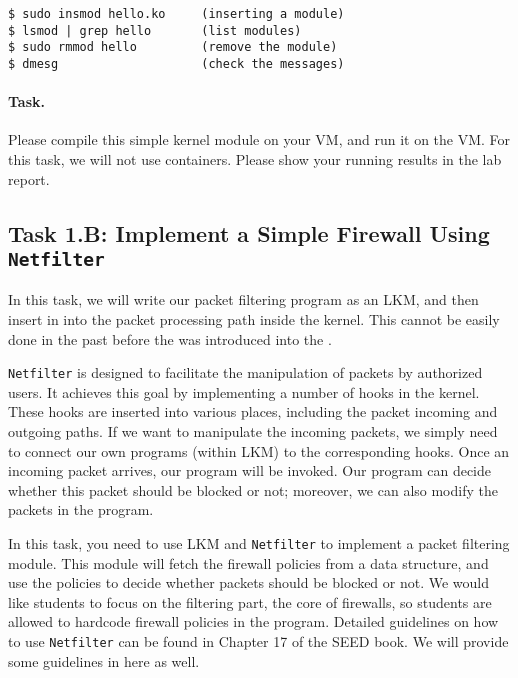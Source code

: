 \begin{lstlisting}
$ sudo insmod hello.ko     (inserting a module)
$ lsmod | grep hello       (list modules)
$ sudo rmmod hello         (remove the module)
$ dmesg                    (check the messages)
\end{lstlisting}


\paragraph{Task.} Please compile this simple kernel module on 
your VM, and run it on the VM. For this task, we will not use 
containers.  Please show your running results in the lab report. 


\subsection{Task 1.B: Implement a Simple Firewall Using \texttt{Netfilter}}  


In this task, we will write our packet filtering program
as an LKM, and then insert in into the packet processing path
inside the kernel. This cannot be easily done in the past before 
the \netfilter was introduced into the \linux.

{\tt Netfilter} is designed to facilitate the manipulation of 
packets by authorized users. It achieves this 
goal by implementing a number of hooks in the 
\linux kernel. These hooks are inserted into various places, 
including the packet incoming and outgoing paths. 
If we want to manipulate the incoming packets, we simply
need to connect our own programs (within LKM) to the 
corresponding hooks. Once an incoming packet arrives, 
our program will be invoked. Our program can decide 
whether this packet should be blocked or not; moreover,
we can also modify the packets in the program.


In this task, you need to use LKM and {\tt Netfilter} to implement
a packet filtering module.  This module will fetch 
the firewall policies from a data structure, and use the 
policies to decide whether packets should be blocked or not.
We would like students to focus on the filtering part, 
the core of firewalls, so students are allowed to hardcode firewall policies 
in the program.  Detailed guidelines on how to use \texttt{Netfilter} can be 
found in Chapter 17 of the SEED book. We will provide 
some guidelines in here as well.


